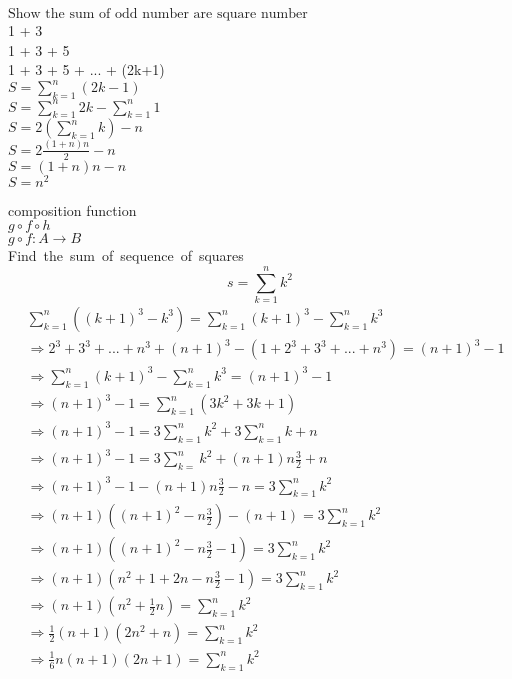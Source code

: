 \documentclass{book}
\begin{document}
\begin{flushleft}
$\text{Show the sum of odd number are square number}$
\\
1 + 3\\
1 + 3 + 5 \\
1 + 3 + 5 + ... + (2k+1) \\
\medskip
$S = \sum_{k=1}^{n} (2k-1)$ \\
$S = \sum_{k=1}^{n} 2k - \sum_{k=1}^{n} 1$ \\
$S = 2(\sum_{k=1}^{n} k) - n $ \\
$S = 2 \frac{(1+n)n}{2} - n$ \\
$S = (1+n)n - n$ \\
$S = n^2 $ \\
\end{flushleft}

composition function \\
$g \circ f \circ h $ \\
$g \circ f \colon A\to B$ \\

\pagebreak
\mbox{Find the sum of sequence of squares}
    \[ s = \sum_{k=1}^{n} k^2 \]
\begin{equation}
\begin{aligned}
    & \sum_{k=1}^{n} ((k+1)^3-k^3) = \sum_{k=1}^{n} (k+1)^3 - \sum_{k=1}^{n} k^3  \\
    & \Rightarrow 2^3 + 3^3 + ... + n^3 + (n+1)^3 - (1 + 2^3 + 3^3 + ... + n^3) = (n+1)^3 -1  \\
    & \Rightarrow  \sum_{k=1}^{n}(k+1)^3 - \sum_{k=1}^{n}k^3 =(n+1)^3 - 1  \\
    & \Rightarrow (n+1)^3-1 = \sum_{k=1}^{n}(3k^2+3k+1)   \\
    & \Rightarrow (n+1)^3-1 = 3\sum_{k=1}^{n} k^2 +  3\sum_{k=1}^{n} k + n   \\
    & \Rightarrow (n+1)^3-1 = 3\sum_{k=}^{n} k^2 + (n+1) n \frac{3}{2} + n  \\
    & \Rightarrow (n+1)^3-1 -  (n+1) n \frac{3}{2} - n= 3\sum_{k=1}^{n} k^2   \\
    & \Rightarrow (n+1)((n+1)^2-n \frac{3}{2})-(n+1) = 3\sum_{k=1}^{n} k^2  \\
    & \Rightarrow (n+1)( (n+1)^2 -n\frac{3}{2}-1) = 3\sum_{k=1}^{n} k^2  	 \\
    & \Rightarrow (n+1)( n^2+1+2n-n\frac{3}{2} - 1) = 3\sum_{k=1}^{n} k^2  	 \\
    & \Rightarrow (n+1)(n^2 + \frac{1}{2}n) = \sum_{k=1}^{n} k^2  \\
    & \Rightarrow \frac{1}{2}(n+1)(2n^2+n)=\sum_{k=1}^{n} k^2  \\
    & \Rightarrow \frac{1}{6}n(n+1)(2n+1) = \sum_{k=1}^{n} k^2  \nonumber \\
\end{aligned}
\end{equation}
\end{document}
